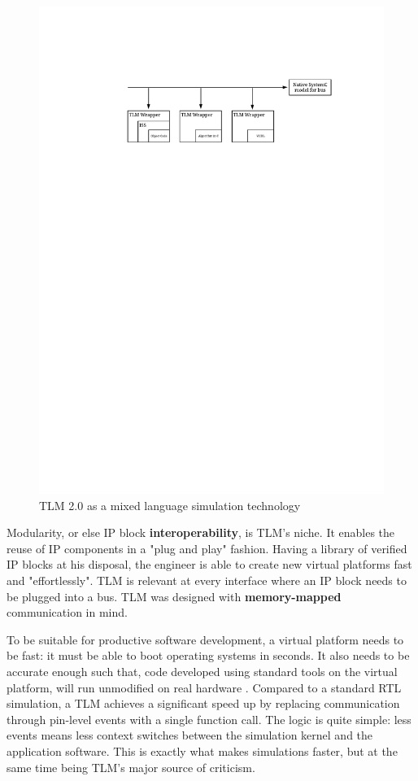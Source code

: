 \documentclass[11pt]{article}
\begin{document}
\begin{figure}[htbp]
\centering
\includegraphics[width=.9\linewidth]{Figures/mixedSimulation.pdf}
\caption{\label{fig:org13715b0}
TLM 2.0 as a mixed language simulation technology}
\end{figure}

Modularity, or else IP block \textbf{interoperability}, is TLM's niche.
It enables the reuse of IP components in a "plug and play" fashion.
Having a library of verified IP blocks at his disposal, the engineer is able to create new virtual platforms fast and "effortlessly".
TLM is relevant at every interface where an IP block needs to be plugged into a bus.
TLM was designed with \textbf{memory-mapped} communication in mind.

To be suitable for productive software development, a virtual platform needs to be fast: it must be able to boot operating systems in seconds.
It also needs to be accurate enough such that, code developed using standard tools on the virtual platform, will run unmodified on real hardware \cite{Leupers2010}. 
Compared to a standard RTL simulation, a TLM achieves a significant speed up by replacing communication through pin-level events with a single function call.
The logic is quite simple: less events means less context switches between the simulation kernel and the application software.
This is exactly what makes simulations faster, but at the same time being TLM's major source of criticism.
\end{document}

